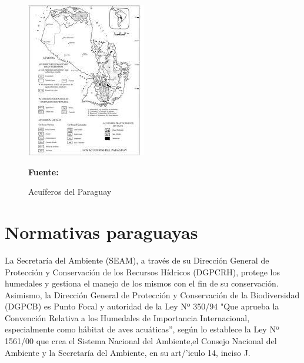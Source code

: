     \begin{figure}[H]
        \centering
        \includegraphics[scale=1]{Imagenes/cap2/images.jpg}
        \caption {Acuíferos del Paraguay} 
        \textbf{Fuente:}
        \cite{alvarez-2014} 
        \label{acuiferosPy}
    \end{figure}




\section{Normativas paraguayas}

La Secretar\'ia del Ambiente (SEAM), a trav\'es de su Direcci\'on General de Protecci\'on y Conservaci\'on de los Recursos H\'idricos (DGPCRH), protege los humedales y gestiona el manejo de los mismos con el fin de su conservaci\'on. Asimismo, la Direcci\'on General de Protecci\'on y Conservaci\'on de la Biodiversidad (DGPCB) es Punto Focal y autoridad de la Ley Nº 350/94 "Que aprueba la Convenci\'on Relativa a los Humedales de Importancia Internacional, especialmente como h\'abitat de aves acu\'aticas”, seg\'un lo establece la Ley Nº 1561/00 que crea el Sistema Nacional del Ambiente,el Consejo Nacional del Ambiente y la Secretar\'ia del Ambiente, en su art/'iculo 14, inciso J.\cite{direccion_general_de_proteccion_y_sitios_nodate}

